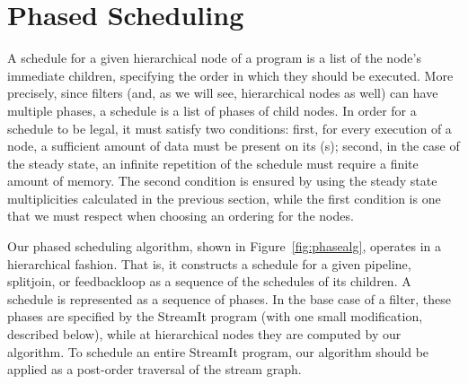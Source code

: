 \documentclass{sig-alt-full}
\begin{document}


\section{Phased Scheduling}
\label{chpt:phased}

A schedule for a given hierarchical node of a {\StreamIt} program is a
list of the node's immediate children, specifying the order in which
they should be executed.  More precisely, since filters (and, as we
will see, hierarchical nodes as well) can have multiple phases, a
schedule is a list of phases of child nodes.  In order for a schedule
to be legal, it must satisfy two conditions: first, for every
execution of a node, a sufficient amount of data must be present on
its {\Input} {\Channel}(s); second, in the case of the steady state,
an infinite repetition of the schedule must require a finite amount of
memory.  The second condition is ensured by using the steady state
multiplicities calculated in the previous section, while the first
condition is one that we must respect when choosing an ordering for
the nodes.

Our phased scheduling algorithm, shown in Figure~\ref{fig:phasealg},
operates in a hierarchical fashion.  That is, it constructs a schedule
for a given pipeline, splitjoin, or feedbackloop as a sequence of the
schedules of its children.  A schedule is represented as a sequence of
phases.  In the base case of a filter, these phases are specified by
the StreamIt program (with one small modification, described below),
while at hierarchical nodes they are computed by our algorithm.  To
schedule an entire StreamIt program, our algorithm should be applied
as a post-order traversal of the stream graph.
\end{document}
